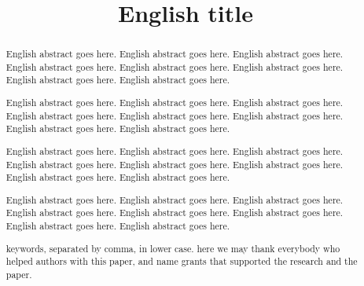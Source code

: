 \documentclass[intlimits,twoside,a4paper,11pt]{article}
\begin{document}
 




\begin{translatedpart}
\title{English title}



\maketranslatedtitle

\begin{abstract}
English abstract goes here. English abstract goes here. English abstract goes here. English abstract goes here.
English abstract goes here. English abstract goes here. English abstract goes here. English abstract goes here.

English abstract goes here. English abstract goes here. English abstract goes here. English abstract goes here.
English abstract goes here. English abstract goes here. English abstract goes here. English abstract goes here.


English abstract goes here. English abstract goes here. English abstract goes here. English abstract goes here.
English abstract goes here. English abstract goes here. English abstract goes here. English abstract goes here.

English abstract goes here. English abstract goes here. English abstract goes here. English abstract goes here.
English abstract goes here. English abstract goes here. English abstract goes here. English abstract goes here.

\keywords keywords, separated by comma, in lower case.
\autocitationexample
\acknowledgements here we may thank everybody who helped authors with this paper, and name grants that supported the research and the paper.
\end{abstract}


\end{translatedpart}

\makekioauthors
\end{document}
